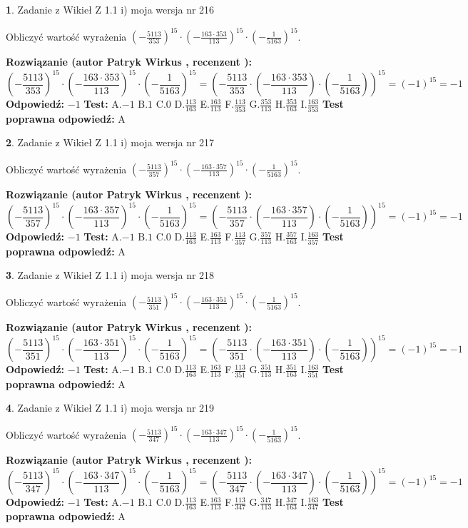\documentclass[12pt, a4paper]{article}
\theoremstyle{definition} %
\newtheorem{zad}{}
\newcommand{\zadStart}[1]{\begin{zad}#1\newline}
\newcommand{\zadStop}{\end{zad}}
\newcommand{\rozwStart}[2]{\noindent \textbf{Rozwiązanie (autor #1 , recenzent #2): }\newline}
\newcommand{\rozwStop}{\newline}
\newcommand{\odpStart}{\noindent \textbf{Odpowiedź:}\newline}
\newcommand{\odpStop}{\newline}
\newcommand{\testStart}{\noindent \textbf{Test:}\newline}
\newcommand{\testStop}{\newline}
\newcommand{\kluczStart}{\noindent \textbf{Test poprawna odpowiedź:}\newline}
\newcommand{\kluczStop}{\newline}
\begin{document}
\zadStart{Zadanie z Wikieł Z 1.1 i) moja wersja nr 216}

Obliczyć wartość wyrażenia $(-\frac{5113}{353})^{15} \cdot (-\frac{163 \cdot 353}{113})^{15} \cdot (-\frac{1}{5163})^{15}$.
\zadStop
\rozwStart{Patryk Wirkus}{}
$$(-\frac{5113}{353})^{15} \cdot (-\frac{163 \cdot 353}{113})^{15} \cdot (-\frac{1}{5163})^{15} = (-\frac{5113}{353} \cdot (-\frac{163 \cdot 353}{113}) \cdot (-\frac{1}{5163}))^{15} = (-1)^{15} = -1$$
\rozwStop
\odpStart
$-1$
\odpStop
\testStart
A.$-1$ B.$1$ C.$0$ D.$\frac{113}{163}$ E.$\frac{163}{113}$
F.$\frac{113}{353}$ G.$\frac{353}{113}$
H.$\frac{353}{163}$
I.$\frac{163}{353}$
\testStop
\kluczStart
A
\kluczStop



\zadStart{Zadanie z Wikieł Z 1.1 i) moja wersja nr 217}

Obliczyć wartość wyrażenia $(-\frac{5113}{357})^{15} \cdot (-\frac{163 \cdot 357}{113})^{15} \cdot (-\frac{1}{5163})^{15}$.
\zadStop
\rozwStart{Patryk Wirkus}{}
$$(-\frac{5113}{357})^{15} \cdot (-\frac{163 \cdot 357}{113})^{15} \cdot (-\frac{1}{5163})^{15} = (-\frac{5113}{357} \cdot (-\frac{163 \cdot 357}{113}) \cdot (-\frac{1}{5163}))^{15} = (-1)^{15} = -1$$
\rozwStop
\odpStart
$-1$
\odpStop
\testStart
A.$-1$ B.$1$ C.$0$ D.$\frac{113}{163}$ E.$\frac{163}{113}$
F.$\frac{113}{357}$ G.$\frac{357}{113}$
H.$\frac{357}{163}$
I.$\frac{163}{357}$
\testStop
\kluczStart
A
\kluczStop



\zadStart{Zadanie z Wikieł Z 1.1 i) moja wersja nr 218}

Obliczyć wartość wyrażenia $(-\frac{5113}{351})^{15} \cdot (-\frac{163 \cdot 351}{113})^{15} \cdot (-\frac{1}{5163})^{15}$.
\zadStop
\rozwStart{Patryk Wirkus}{}
$$(-\frac{5113}{351})^{15} \cdot (-\frac{163 \cdot 351}{113})^{15} \cdot (-\frac{1}{5163})^{15} = (-\frac{5113}{351} \cdot (-\frac{163 \cdot 351}{113}) \cdot (-\frac{1}{5163}))^{15} = (-1)^{15} = -1$$
\rozwStop
\odpStart
$-1$
\odpStop
\testStart
A.$-1$ B.$1$ C.$0$ D.$\frac{113}{163}$ E.$\frac{163}{113}$
F.$\frac{113}{351}$ G.$\frac{351}{113}$
H.$\frac{351}{163}$
I.$\frac{163}{351}$
\testStop
\kluczStart
A
\kluczStop



\zadStart{Zadanie z Wikieł Z 1.1 i) moja wersja nr 219}

Obliczyć wartość wyrażenia $(-\frac{5113}{347})^{15} \cdot (-\frac{163 \cdot 347}{113})^{15} \cdot (-\frac{1}{5163})^{15}$.
\zadStop
\rozwStart{Patryk Wirkus}{}
$$(-\frac{5113}{347})^{15} \cdot (-\frac{163 \cdot 347}{113})^{15} \cdot (-\frac{1}{5163})^{15} = (-\frac{5113}{347} \cdot (-\frac{163 \cdot 347}{113}) \cdot (-\frac{1}{5163}))^{15} = (-1)^{15} = -1$$
\rozwStop
\odpStart
$-1$
\odpStop
\testStart
A.$-1$ B.$1$ C.$0$ D.$\frac{113}{163}$ E.$\frac{163}{113}$
F.$\frac{113}{347}$ G.$\frac{347}{113}$
H.$\frac{347}{163}$
I.$\frac{163}{347}$
\testStop
\kluczStart
A
\kluczStop
\end{document}
